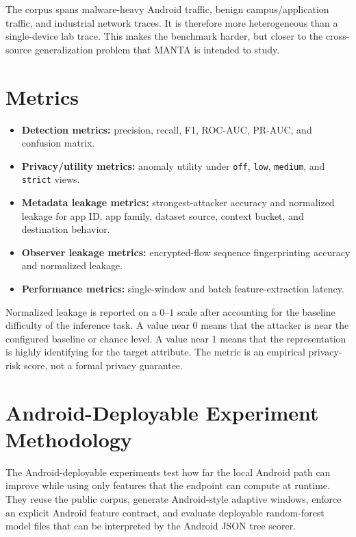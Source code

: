 The corpus spans malware-heavy Android traffic, benign campus/application traffic, and industrial
network traces. It is therefore more heterogeneous than a single-device lab trace. This makes the
benchmark harder, but closer to the cross-source generalization problem that MANTA is intended to
study.

\section{Metrics}
\begin{itemize}[leftmargin=*]
  \item \textbf{Detection metrics:} precision, recall, F1, ROC-AUC, PR-AUC, and confusion matrix.
  \item \textbf{Privacy/utility metrics:} anomaly utility under \texttt{off}, \texttt{low},
  \texttt{medium}, and \texttt{strict} views.
  \item \textbf{Metadata leakage metrics:} strongest-attacker accuracy and normalized leakage for
  app ID, app family, dataset source, context bucket, and destination behavior.
  \item \textbf{Observer leakage metrics:} encrypted-flow sequence fingerprinting accuracy and
  normalized leakage.
  \item \textbf{Performance metrics:} single-window and batch feature-extraction latency.
\end{itemize}

Normalized leakage is reported on a \(0\)--\(1\) scale after accounting for the baseline difficulty
of the inference task. A value near \(0\) means that the attacker is near the configured baseline or
chance level. A value near \(1\) means that the representation is highly identifying for the target
attribute. The metric is an empirical privacy-risk score, not a formal privacy guarantee.

\section{Android-Deployable Experiment Methodology}
The Android-deployable experiments test how far the local Android path can improve while using only
features that the endpoint can compute at runtime. They reuse the public corpus, generate
Android-style adaptive windows, enforce an explicit Android feature contract, and evaluate
deployable random-forest model files that can be interpreted by the Android JSON tree scorer.

